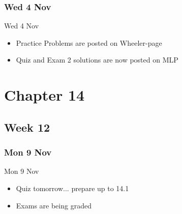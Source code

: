 \documentclass[12pt]{beamer}
\theoremstyle{plain}
\theoremstyle{definition}
\begin{document}
\subsubsection{Wed 4 Nov}
\begin{frame}{Wed 4 Nov}%
\begin{itemize}
\item Practice Problems are posted on Wheeler-page
\item Quiz and Exam 2 solutions are now posted on MLP
\end{itemize}
\end{frame}

\section{Chapter 14}
\subsection{Week 12}
\subsubsection{Mon 9 Nov}
\begin{frame}{Mon 9 Nov}%
\begin{itemize}
\item Quiz tomorrow... prepare up to 14.1 
\item Exams are being graded
\end{itemize}
\end{frame}
\end{document}
